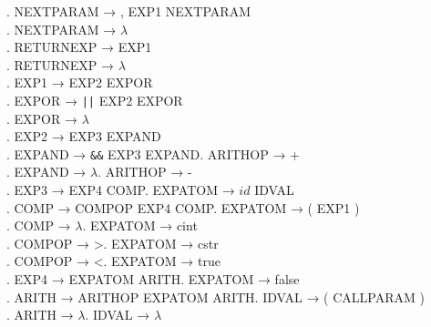 \begin{tabbing}
    . NEXTPARAM → , EXP1 NEXTPARAM\\
    . NEXTPARAM → $\lambda$\\
    . RETURNEXP → EXP1\\
    . RETURNEXP → $\lambda$\\
    . EXP1 → EXP2 EXPOR\\
    . EXPOR → \verb!||! EXP2 EXPOR\\
    . EXPOR → $\lambda$\\
    . EXP2 → EXP3 EXPAND\\
    . EXPAND → \verb!&&! EXP3 EXPAND. ARITHOP → +\\
    . EXPAND → $\lambda$. ARITHOP → -\\
    . EXP3 → EXP4 COMP. EXPATOM → $id$ IDVAL\\
    . COMP → COMPOP EXP4 COMP. EXPATOM → ( EXP1 )\\
    . COMP → $\lambda$. EXPATOM → cint\\
    . COMPOP → >. EXPATOM → cstr\\
    . COMPOP → <. EXPATOM → true\\
    . EXP4 → EXPATOM ARITH. EXPATOM → false\\
    . ARITH → ARITHOP EXPATOM ARITH. IDVAL → ( CALLPARAM )\\
    . ARITH → $\lambda$. IDVAL → $\lambda$\\
\end{tabbing}